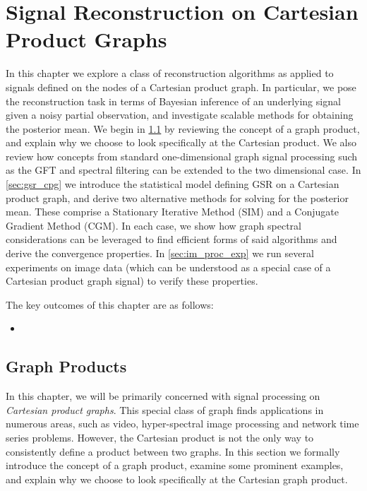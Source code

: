 \chapter{Signal Reconstruction on Cartesian Product Graphs}

\label{chap:reg_and_rec}



In this chapter we explore a class of reconstruction algorithms as applied to signals defined on the nodes of a Cartesian product graph. In particular, we pose the reconstruction task in terms of Bayesian inference of an underlying signal given a noisy partial observation, and investigate scalable methods for obtaining the posterior mean. We begin in \cref{sec:reg_and_rec_intro} by reviewing the concept of a graph product, and explain why we choose to look specifically at the Cartesian product. We also review how concepts from standard one-dimensional graph signal processing such as the GFT and spectral filtering can be extended to the two dimensional case. In \cref{sec:gsr_cpg} we introduce the statistical model defining GSR on a Cartesian product graph, and derive two alternative methods for solving for the posterior mean. These comprise a Stationary Iterative Method (SIM) and a Conjugate Gradient Method (CGM). In each case, we show how graph spectral considerations can be leveraged to find efficient forms of said algorithms and derive the convergence properties. In \cref{sec:im_proc_exp} we run several experiments on image data (which can be understood as a special case of a Cartesian product graph signal) to verify these properties. 

The key outcomes of this chapter are as follows:

\begin{itemize}
    \item 
\end{itemize}



\section{Graph Products}

\label{sec:reg_and_rec_intro}

In this chapter, we will be primarily concerned with signal processing on \textit{Cartesian product graphs}. This special class of graph finds applications in numerous areas, such as video, hyper-spectral image processing and network time series problems. However, the Cartesian product is not the only way to consistently define a product between two graphs. In this section we formally introduce the concept of a graph product, examine  some prominent examples, and explain why we choose to look specifically at the Cartesian graph product.

